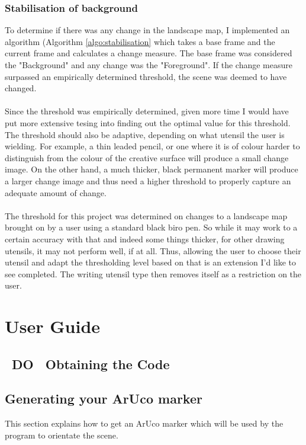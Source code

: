 \documentclass[11pt]{article}
\begin{document}
\subsubsection{Stabilisation of background}
To determine if there was any change in the landscape map, I implemented an
algorithm (Algorithm \ref{algo:stabilisation} which takes a base frame 
and the current frame and calculates a change measure. The base 
frame was considered the "Background" and any change was the
"Foreground". If the change measure surpassed an empirically determined 
threshold, the scene was deemed to have changed.\\
\\
Since the threshold was empirically determined, given more time I would
have put more extensive tesing into finding out the optimal value for 
this threshold. The threshold should also be adaptive, depending on what
utensil the user is wielding. For example, a thin leaded pencil, or one where
it is of colour harder to distinguish from the colour of the creative 
surface will produce a small change image. On the other hand, a 
much thicker, black permanent marker will produce a larger change image and
thus need a higher threshold to properly capture an adequate amount of 
change.\\
\\
The threshold for this project was determined on changes to a landscape
map brought on by a user using a standard black biro pen. So while it
may work to a certain accuracy with that and indeed some things thicker,
for other drawing utensils, it may not perform well, if at all. Thus,
allowing the user to choose their utensil and adapt the thresholding 
level based on that is an extension I'd like to see completed. The
writing utensil type then removes itself as a restriction on the user.

\newpage
\section{User Guide}
\label{chapter:userguide}
\newpage
\subsection{~DO~ Obtaining the Code}
\label{guide:obtainingcode}


\subsection{Generating your ArUco marker}
This section explains how to get an ArUco marker which will be used 
by the program to orientate the scene. 
\end{document}
